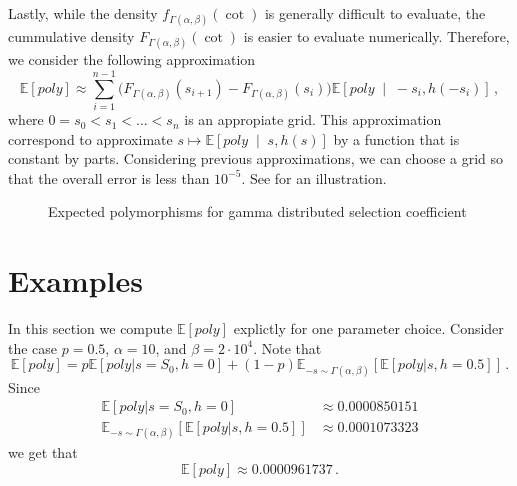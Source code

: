 \documentclass[a4paper,11pt]{article}
\newcommand{\EE}{\mathbb{E}}
\newcommand{\1}{\mathds{1}}
\newcommand{\cond}{\;\middle\vert\;}
\theoremstyle{plain} %
\theoremstyle{definition} %
\theoremstyle{remark} %
\begin{document}
Lastly, while the density $f_{\Gamma(\alpha, \beta)}(\cot)$ is generally difficult to evaluate, the cummulative density $F_{\Gamma(\alpha, \beta)}(\cot)$ is easier to evaluate numerically.
Therefore, we consider the following approximation
\[
	\EE[poly] 
			\approx \sum_{i = 1}^{n - 1} \big( F_{\Gamma(\alpha, \beta)}(s_{i + 1}) - F_{\Gamma(\alpha, \beta)}(s_{i}) \big) \EE \left[ poly \cond -s_{i}, h(-s_{i}) \right] \,,
\]
where $0 = s_0 < s_1 < \ldots < s_n$ is an appropiate grid.
This approximation correspond to approximate $s \mapsto \EE \left[ poly \cond s, h(s) \right]$ by a function that is constant by parts.
Considering previous approximations, we can choose a grid so that the overall error is less than $10^{-5}$.
See  for an illustration.

\begin{figure}[h]
	\centering
	\pgfplotsset{width=7cm}
	\caption{Expected polymorphisms for gamma distributed selection coefficient}
	\label{Figure: Approximation alpah = 1}
\end{figure}


\section{Examples}

In this section we compute $\EE[poly]$ explictly for one parameter choice. 
Consider the case $p = 0.5$, $\alpha = 10$, and $\beta = 2 \cdot 10^4$.
Note that
\[
	\EE[ poly ] = p \EE[ poly | s = S_0, h = 0] + (1 - p) \EE_{-s \sim \Gamma(\alpha, \beta)} [ \EE[ poly | s, h = 0.5] ] \,.
\]
Since
\begin{align*}
	\EE[ poly | s = S_0, h = 0] 
		&\approx 0.0000850151 \\
	\EE_{-s \sim \Gamma(\alpha, \beta)} [ \EE[ poly | s, h = 0.5] ]
		&\approx 0.0001073323
\end{align*}
we get that
\[
	\EE[ poly ] \approx 0.0000961737 \,.
\]
\end{document}
